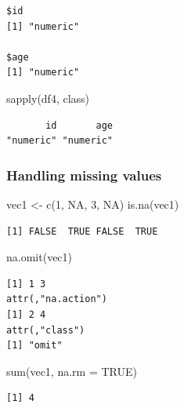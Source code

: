 \documentclass[
  letterpaper,
  DIV=11,
  numbers=noendperiod]{scrartcl}
\newenvironment{Shaded}{\begin{snugshade}}{\end{snugshade}}
\newcommand{\AttributeTok}[1]{\textcolor[rgb]{0.40,0.45,0.13}{#1}}
\newcommand{\ConstantTok}[1]{\textcolor[rgb]{0.56,0.35,0.01}{#1}}
\newcommand{\DecValTok}[1]{\textcolor[rgb]{0.68,0.00,0.00}{#1}}
\newcommand{\FunctionTok}[1]{\textcolor[rgb]{0.28,0.35,0.67}{#1}}
\newcommand{\NormalTok}[1]{\textcolor[rgb]{0.00,0.23,0.31}{#1}}
\newcommand{\OtherTok}[1]{\textcolor[rgb]{0.00,0.23,0.31}{#1}}
\begin{document}
\begin{verbatim}
$id
[1] "numeric"

$age
[1] "numeric"
\end{verbatim}

\begin{Shaded}
\begin{Highlighting}[]
\FunctionTok{sapply}\NormalTok{(df4, class)}
\end{Highlighting}
\end{Shaded}

\begin{verbatim}
       id       age 
"numeric" "numeric" 
\end{verbatim}

\subsubsection{Handling missing values}\label{handling-missing-values}

\begin{Shaded}
\begin{Highlighting}[]
\NormalTok{vec1 }\OtherTok{\textless{}{-}} \FunctionTok{c}\NormalTok{(}\DecValTok{1}\NormalTok{, }\ConstantTok{NA}\NormalTok{, }\DecValTok{3}\NormalTok{, }\ConstantTok{NA}\NormalTok{)}
\FunctionTok{is.na}\NormalTok{(vec1)}
\end{Highlighting}
\end{Shaded}

\begin{verbatim}
[1] FALSE  TRUE FALSE  TRUE
\end{verbatim}

\begin{Shaded}
\begin{Highlighting}[]
\FunctionTok{na.omit}\NormalTok{(vec1)}
\end{Highlighting}
\end{Shaded}

\begin{verbatim}
[1] 1 3
attr(,"na.action")
[1] 2 4
attr(,"class")
[1] "omit"
\end{verbatim}

\begin{Shaded}
\begin{Highlighting}[]
\FunctionTok{sum}\NormalTok{(vec1, }\AttributeTok{na.rm =} \ConstantTok{TRUE}\NormalTok{)}
\end{Highlighting}
\end{Shaded}

\begin{verbatim}
[1] 4
\end{verbatim}
\end{document}
